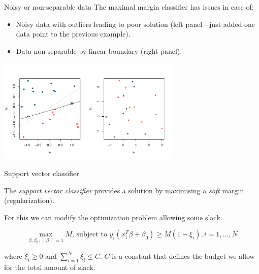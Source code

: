 \documentclass[notes]{beamer}          %
\newcommand{\norm}[1]{\left\lVert#1\right\rVert}
\providecommand{\norm}[1]{\lVert#1\rVert}
\begin{document}
\begin{frame}{Noisy or non-separable data}
The maximal margin classifier has issues in case of:
\begin{itemize}
    \item Noisy data with outliers leading to poor solution (left panel - just added one data point to the previous example).
    \item Data non-separable by linear boundary (right panel).
\end{itemize}

\begin{center}
\includegraphics[height=5cm]{../figures/week_2_classification/svm_outlier_or_not_separable.pdf}  
\end{center}
    
\end{frame}


\begin{frame}{Support vector classifier}

The \textit{support vector classifier} provides a solution by maximising a \textit{soft} margin (regularization).

\vspace{5mm}

For this we can modify the optimization problem allowing some slack.

\begin{equation*}
\max_{\beta, \beta_0, \norm{\beta} = 1} M \text{, subject to } y_i(x^T_i \beta + \beta_0) \geq M (1-\xi_i), i=1, \dots, N
\end{equation*}

where $\xi_i \geq 0$ and $\sum_{i=1}^N \xi_i \leq C$. $C$ is a constant that defines the budget we allow for the total amount of slack.

\vspace{5mm}



\end{frame}
\end{document}
